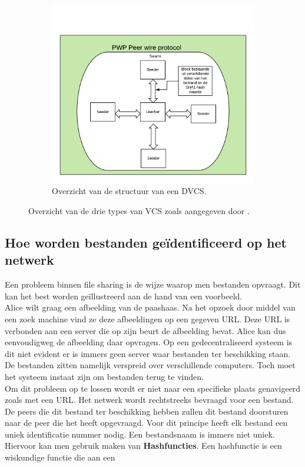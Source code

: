 \begin{figure}[h!]
\begin{subfigure}{.5\textwidth}
		\includegraphics[scale=0.3]{PWP-1.png}
	\caption[Overzicht structuur DVCS]{Overzicht van de structuur van een DVCS.}
	\end{subfigure}
	
	\caption[Overzicht types VCS]{Overzicht van de drie types van VCS zoals aangegeven door \textcite{Chacon2014}.}\label{fig_types_cvs}
\end{figure}
\newpage

\subsection{Hoe worden bestanden geïdentificeerd op het netwerk}
Een probleem binnen file sharing is de wijze waarop men bestanden opvraagt. Dit kan het best worden geïllustreerd aan de hand van een voorbeeld.\\

Alice wilt graag een afbeelding van de paashaas. Na het opzoek door middel van een zoek machine vind ze deze afbeeldingen op een gegeven URL. Deze URL is verbonden aan een server die op zijn beurt de afbeelding bevat. Alice kan dus eenvoudigweg de afbeelding daar opvragen. Op een gedecentraliseerd systeem is dit niet evident er is immers geen server waar bestanden ter beschikking staan. De bestanden zitten namelijk verspreid over verschillende computers. Toch moet het systeem instaat zijn om bestanden terug te vinden.\\

Om dit probleem op te lossen wordt er niet naar een specifieke plaats genavigeerd zoals met een URL. Het netwerk wordt rechtstreeks bevraagd voor een bestand. De peers die dit bestand ter beschikking hebben zullen dit bestand doorsturen naar de peer die het heeft opgevraagd. Voor dit principe heeft elk bestand een uniek identificatie nummer nodig. Een bestandsnaam is immers niet uniek.\\

Hiervoor kan men gebruik maken van \textbf{Hashfuncties}. Een hashfunctie is een wiskundige functie die aan een
